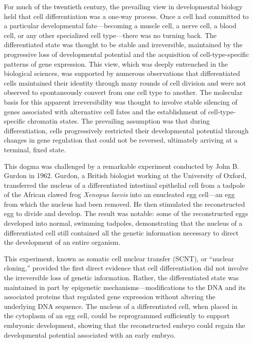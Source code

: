 For much of the twentieth century, the prevailing view in developmental biology held that cell differentiation was a one-way process. Once a cell had committed to a particular developmental fate---becoming a muscle cell, a nerve cell, a blood cell, or any other specialized cell type---there was no turning back. The differentiated state was thought to be stable and irreversible, maintained by the progressive loss of developmental potential and the acquisition of cell-type-specific patterns of gene expression. This view, which was deeply entrenched in the biological sciences, was supported by numerous observations that differentiated cells maintained their identity through many rounds of cell division and were not observed to spontaneously convert from one cell type to another. The molecular basis for this apparent irreversibility was thought to involve stable silencing of genes associated with alternative cell fates and the establishment of cell-type-specific chromatin states. The prevailing assumption was that during differentiation, cells progressively restricted their developmental potential through changes in gene regulation that could not be reversed, ultimately arriving at a terminal, fixed state.

This dogma was challenged by a remarkable experiment conducted by John B. Gurdon in 1962. Gurdon, a British biologist working at the University of Oxford, transferred the nucleus of a differentiated intestinal epithelial cell from a tadpole of the African clawed frog \textit{Xenopus laevis} into an enucleated egg cell---an egg from which the nucleus had been removed. He then stimulated the reconstructed egg to divide and develop. The result was notable: some of the reconstructed eggs developed into normal, swimming tadpoles, demonstrating that the nucleus of a differentiated cell still contained all the genetic information necessary to direct the development of an entire organism.

This experiment, known as somatic cell nuclear transfer (SCNT), or ``nuclear cloning,'' provided the first direct evidence that cell differentiation did not involve the irreversible loss of genetic information. Rather, the differentiated state was maintained in part by epigenetic mechanisms---modifications to the DNA and its associated proteins that regulated gene expression without altering the underlying DNA sequence. The nucleus of a differentiated cell, when placed in the cytoplasm of an egg cell, could be reprogrammed sufficiently to support embryonic development, showing that the reconstructed embryo could regain the developmental potential associated with an early embryo.

